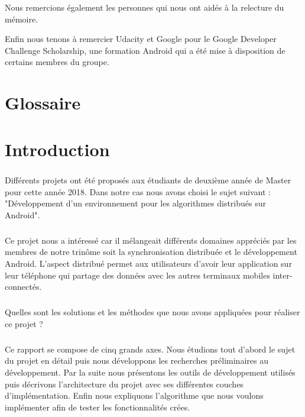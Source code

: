 \documentclass[a4paper,10pt]{report}
\begin{document}
Nous remercions également les personnes qui nous ont aidés à la relecture du mémoire.

Enfin nous tenons à remercier Udacity et Google pour le Google Developer Challenge Scholarship, une formation Android qui a été mise à disposition de certains membres du groupe.
\begin{changemargin}
\tableofcontents
\end{changemargin}
\chapter*{Glossaire}

\chapter{Introduction}
\sloppy
  \paragraph{}
  Différents projets ont été proposés aux étudiants de deuxième année de Master pour cette année 2018. Dans notre cas nous avons choisi le sujet suivant : "Développement d’un environnement pour les algorithmes distribués sur Android".
  \paragraph{}
  Ce projet nous a intéressé car il mélangeait différents domaines appréciés par les membres de notre trinôme soit la synchronisation distribuée et le développement Android.
  L'aspect distribué permet aux utilisateurs d'avoir leur application sur leur téléphone qui partage des données avec les autres terminaux mobiles inter-connectés.
  \paragraph{}
  Quelles sont les solutions et les méthodes que nous avons appliquées pour réaliser ce projet ?
  \paragraph{}
  Ce rapport se compose de cinq grands axes. Nous étudions tout d'abord le sujet du projet en détail puis nous développons les recherches préliminaires au développement. 	Par la suite nous présentons les outils de développement utilisés puis décrivons l'architecture du projet avec ses différentes couches d'implémentation. Enfin nous expliquons l'algorithme que nous voulons implémenter afin de tester les fonctionnalités crées.
\end{document}
